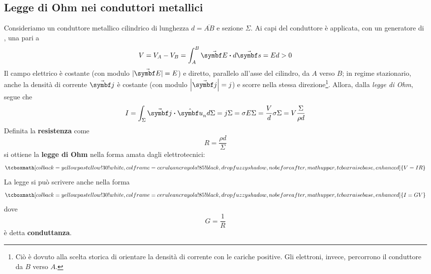 \subsection{Legge di Ohm nei conduttori metallici}
Consideriamo un conduttore metallico cilindrico di lunghezza $d=\overline{AB}$ e sezione $\Sigma$. Ai capi del conduttore è applicata, con un generatore di \fem, una \ddp pari a
\begin{equation*}
	V=V_A-V_B=\int_{A}^{B}\vba{E}\vdot d\vba{s}=Ed>0
\end{equation*}
Il campo elettrico è costante (con modulo $|\vba{E}|=E$) e diretto, parallelo all'asse del cilindro, da $A$ verso $B$; in regime stazionario, anche la densità di corrente $\vba{j}$ è costante (con modulo $\abs{\vba{j}}=j$) e scorre nella stessa direzione\footnote{Ciò è dovuto alla scelta storica di orientare la densità di corrente con le cariche positive. Gli elettroni, invece, percorrono il conduttore da $B$ verso $A$.}. Allora, dalla \textit{legge di Ohm}, segue che
\begin{equation*}
	I=\int_{\Sigma}\vba{j}\vdot\vbh{u}_nd\Sigma=j\Sigma=\sigma E\Sigma=\frac{V}{d}\sigma\Sigma=V\frac{\Sigma}{\rho d}
\end{equation*}
Definita la \textbf{resistenza} come
\begin{equation*}
	R=\frac{\rho d}{\Sigma}
\end{equation*}
si ottiene la \textbf{legge di Ohm} nella forma amata dagli elettrotecnici:
\begin{equation}
	\tcboxmath[colback=yellowpastellow!30!white,colframe=ceruleancrayola!85!black,drop fuzzy shadow, nobeforeafter, math upper, tcbox raise base, enhanced]{V=IR}
\end{equation}
La legge si può scrivere anche nella forma
\begin{equation}
	\tcboxmath[colback=yellowpastellow!30!white,colframe=ceruleancrayola!85!black,drop fuzzy shadow, nobeforeafter, math upper, tcbox raise base, enhanced]{I=GV}
\end{equation}
dove
\begin{equation*}
	G=\frac{1}{R}
\end{equation*}
è detta \textbf{conduttanza}.
